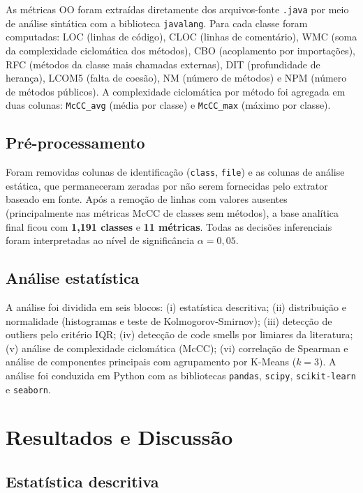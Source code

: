 \documentclass[12pt]{article}
\begin{document}
As métricas OO foram extraídas diretamente dos arquivos-fonte \texttt{.java} por meio de análise sintática com a biblioteca \texttt{javalang}. Para cada classe foram computadas: LOC (linhas de código), CLOC (linhas de comentário), WMC (soma da complexidade ciclomática dos métodos), CBO (acoplamento por importações), RFC (métodos da classe mais chamadas externas), DIT (profundidade de herança), LCOM5 (falta de coesão), NM (número de métodos) e NPM (número de métodos públicos). A complexidade ciclomática por método foi agregada em duas colunas: \texttt{McCC\_avg} (média por classe) e \texttt{McCC\_max} (máximo por classe).

\subsection{Pré-processamento}

Foram removidas colunas de identificação (\texttt{class}, \texttt{file}) e as colunas de análise estática, que permaneceram zeradas por não serem fornecidas pelo extrator baseado em fonte. Após a remoção de linhas com valores ausentes (principalmente nas métricas McCC de classes sem métodos), a base analítica final ficou com \textbf{1{,}191 classes} e \textbf{11 métricas}. Todas as decisões inferenciais foram interpretadas ao nível de significância $\alpha = 0{,}05$.

\subsection{Análise estatística}

A análise foi dividida em seis blocos: (i) estatística descritiva; (ii) distribuição e normalidade (histogramas e teste de Kolmogorov-Smirnov); (iii) detecção de outliers pelo critério IQR; (iv) detecção de code smells por limiares da literatura; (v) análise de complexidade ciclomática (McCC); (vi) correlação de Spearman e análise de componentes principais com agrupamento por K-Means ($k=3$). A análise foi conduzida em Python com as bibliotecas \texttt{pandas}, \texttt{scipy}, \texttt{scikit-learn} e \texttt{seaborn}.

\section{Resultados e Discussão}

\subsection{Estatística descritiva}
\end{document}
